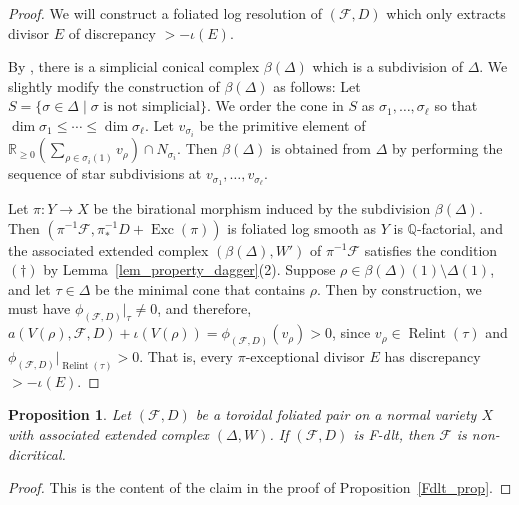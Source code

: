 \documentclass[12pt,reqno]{amsart}
\newtheorem{proposition}[theorem]{Proposition}
\theoremstyle{definition}
\newcommand{\on}{\operatorname}
\newcommand\cF{{\mathcal{F}}}
\newcommand\bQ{{\mathbb Q}}
\newcommand\bR{{\mathbb R}}
\begin{document}
\begin{proof}
    We will construct a foliated log resolution of $(\cF,D)$ which only extracts divisor $E$ of discrepancy $>-\iota(E)$. 
    
    By \cite[Exercise 11.1.10]{CLS11}, there is a simplicial conical complex $\beta(\Delta)$ which is a subdivision of $\Delta$. 
    We slightly modify the construction of $\beta(\Delta)$ as follows:
    Let $S=\{\sigma\in\Delta\mid \sigma \mbox{ is not simplicial}\}$. 
    We order the cone in $S$ as $\sigma_1,\ldots,\sigma_\ell$ so that $\dim\sigma_1\leq\cdots\leq\dim\sigma_\ell$. 
    Let $v_{\sigma_i}$ be the primitive element of $\bR_{\geq 0}(\sum_{\rho\in\sigma_i(1)}v_\rho)\cap N_{\sigma_i}$. 
    Then $\beta(\Delta)$ is obtained from $\Delta$ by performing the sequence of star subdivisions at $v_{\sigma_1},\ldots,v_{\sigma_\ell}$.  

    
    Let $\pi\colon Y\to X$ be the birational morphism induced by the subdivision $\beta(\Delta)$. Then $(\pi^{-1}\cF,\pi^{-1}_*D+\on{Exc}(\pi))$ is foliated log smooth as $Y$ is $\bQ$-factorial, and the associated extended complex $(\beta(\Delta),W')$ of $\pi^{-1}\cF$ satisfies the condition $(\dagger)$ by Lemma~\ref{lem_property_dagger}(2). Suppose $\rho\in\beta(\Delta)(1)\setminus\Delta(1)$, and let $\tau\in\Delta$ be the minimal cone that contains $\rho$. Then by construction, we must have $\phi_{(\cF,D)}\vert_{\tau}\neq 0$, and therefore, $a(V(\rho),\cF,D)+\iota(V(\rho))=\phi_{(\cF,D)}(v_\rho)>0$, since $v_\rho\in\on{Relint}(\tau)$ and $\phi_{(\cF,D)}\vert_{\on{Relint}(\tau)}> 0$. That is, every $\pi$-exceptional divisor $E$ has discrepancy $>-\iota(E)$. 
    \end{proof}


\begin{proposition}\label{Fdlt_ND_prop}
    Let $(\cF,D)$ be a toroidal foliated pair on a normal variety $X$ with associated extended complex $(\Delta,W)$. 
    If $(\cF,D)$ is F-dlt, then $\cF$ is non-dicritical. 
\end{proposition}
\begin{proof}
    This is the content of the claim in the proof of Proposition~\ref{Fdlt_prop}.
\end{proof}
\end{document}
